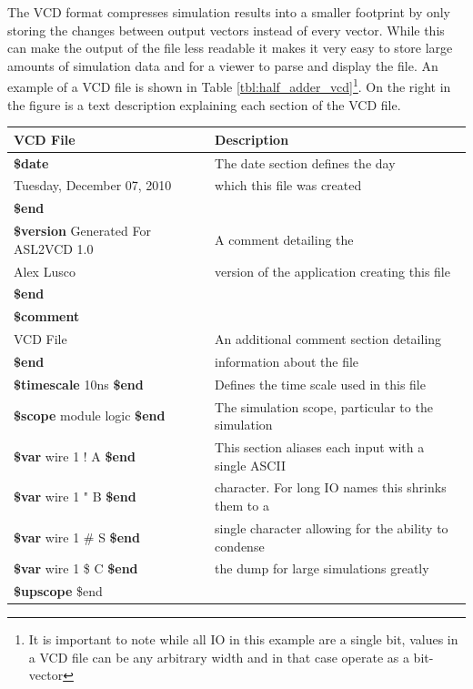 \documentclass[12pt]{report}
\begin{document}
The VCD format compresses simulation results into a smaller footprint by only storing the changes between output vectors instead of every vector\cite{verilog}.  While this can make the output of the file less readable it makes it very easy to store large amounts of simulation data and for a viewer to parse and display the file.  An example of a VCD file is shown in Table \ref{tbl:half_adder_vcd}\footnote{It is important to note while all IO in this example are a single bit, values in a VCD file can be any arbitrary width and in that case operate as a bit-vector}.  On the right in the figure is a text description explaining each section of the VCD file.
\begin{table}
	\begin{center}
		\begin{tabular}{l|l}
			VCD File & Description \\ \hline
			\textbf{\$date} & The date section defines the day\\
			Tuesday, December 07, 2010 & which this file was created \\
			\textbf{\$end} & \\
			\textbf{\$version}
			Generated For ASL2VCD 1.0 & A comment detailing the  \\
			Alex Lusco & version of the application creating this file \\
			\textbf{\$end}	\\
			\textbf{\$comment}	\\
			VCD File & An additional comment section detailing \\
			\textbf{\$end} & information about the file \\
			\textbf{\$timescale} 10ns \textbf{\$end} & Defines the time scale used in this file \\
			\textbf{\$scope} module logic \textbf{\$end} & The simulation scope, particular to the simulation \\
			\textbf{\$var} wire 1 ! A \textbf{\$end} & This section aliases each input with a single ASCII \\
			\textbf{\$var} wire 1 " B \textbf{\$end} & character. For long IO names this shrinks them to a  \\
			\textbf{\$var} wire 1 \# S \textbf{\$end} & single character allowing for the ability to condense \\
			\textbf{\$var} wire 1 \$ C \textbf{\$end} & the dump for large simulations greatly \\
			\textbf{\$upscope} \$end & \\

\end{tabular}
\end{center}
\end{table}
\end{document}
